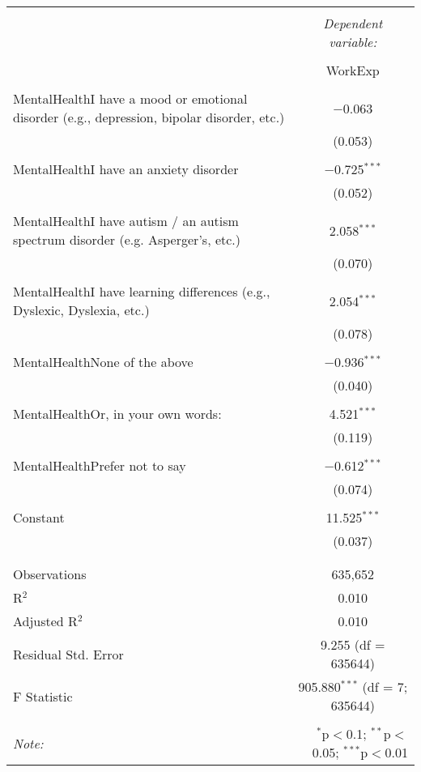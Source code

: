 
\begin{table}[!htbp] \centering 
  \caption{} 
  \label{} 
\begin{tabular}{@{\extracolsep{5pt}}lc} 
\\[-1.8ex]\hline 
\hline \\[-1.8ex] 
 & \multicolumn{1}{c}{\textit{Dependent variable:}} \\ 
\cline{2-2} 
\\[-1.8ex] & WorkExp \\ 
\hline \\[-1.8ex] 
 MentalHealthI have a mood or emotional disorder (e.g., depression, bipolar disorder, etc.) & $-$0.063 \\ 
  & (0.053) \\ 
  & \\ 
 MentalHealthI have an anxiety disorder & $-$0.725$^{***}$ \\ 
  & (0.052) \\ 
  & \\ 
 MentalHealthI have autism / an autism spectrum disorder (e.g. Asperger's, etc.) & 2.058$^{***}$ \\ 
  & (0.070) \\ 
  & \\ 
 MentalHealthI have learning differences (e.g., Dyslexic, Dyslexia, etc.) & 2.054$^{***}$ \\ 
  & (0.078) \\ 
  & \\ 
 MentalHealthNone of the above & $-$0.936$^{***}$ \\ 
  & (0.040) \\ 
  & \\ 
 MentalHealthOr, in your own words: & 4.521$^{***}$ \\ 
  & (0.119) \\ 
  & \\ 
 MentalHealthPrefer not to say & $-$0.612$^{***}$ \\ 
  & (0.074) \\ 
  & \\ 
 Constant & 11.525$^{***}$ \\ 
  & (0.037) \\ 
  & \\ 
\hline \\[-1.8ex] 
Observations & 635,652 \\ 
R$^{2}$ & 0.010 \\ 
Adjusted R$^{2}$ & 0.010 \\ 
Residual Std. Error & 9.255 (df = 635644) \\ 
F Statistic & 905.880$^{***}$ (df = 7; 635644) \\ 
\hline 
\hline \\[-1.8ex] 
\textit{Note:}  & \multicolumn{1}{r}{$^{*}$p$<$0.1; $^{**}$p$<$0.05; $^{***}$p$<$0.01} \\ 
\end{tabular} 
\end{table} 

